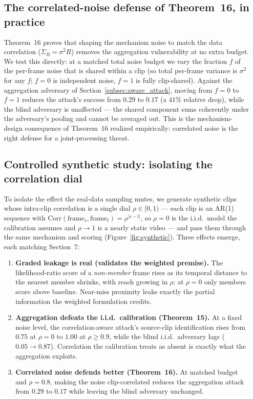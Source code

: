 \subsection{The correlated-noise defense of Theorem~16, in practice}
\label{subsec:corr_noise}

Theorem~16 proves that shaping the mechanism noise to match the data
correlation ($\Sigma_B=\sigma^2 R$) removes the aggregation vulnerability at
no extra budget. We test this directly: at a matched total noise budget we
vary the fraction $f$ of the per-frame noise that is shared within a clip
(so total per-frame variance is $\sigma^2$ for any $f$; $f{=}0$ is
independent noise, $f{=}1$ is fully clip-shared). Against the aggregation
adversary of Section~\ref{subsec:aware_attack}, moving from $f{=}0$ to
$f{=}1$ reduces the attack's success from $0.29$ to $0.17$ (a $41\%$
relative drop), while the blind adversary is unaffected --- the shared
component sums coherently under the adversary's pooling and cannot be
averaged out. This is the mechanism-design consequence of Theorem~16
realized empirically: correlated noise is the right defense for a
joint-processing threat.

\subsection{Controlled synthetic study: isolating the correlation dial}
\label{subsec:synthetic}

To isolate the effect the real-data sampling mutes, we generate synthetic
clips whose intra-clip correlation is a single dial $\rho\in[0,1)$ --- each
clip is an AR(1) sequence with $\mathrm{Corr}(\text{frame}_s,\text{frame}_t)
=\rho^{|s-t|}$, so $\rho{=}0$ is the i.i.d.\ model the calibration assumes
and $\rho\to1$ is a nearly static video --- and pass them through the same
mechanism and scoring (Figure~\ref{fig:synthetic}). Three effects emerge, each
matching Section~7:
\begin{enumerate}[leftmargin=*]
\item \textbf{Graded leakage is real (validates the weighted premise).} The
likelihood-ratio score of a \emph{non-member} frame rises as its temporal
distance to the nearest member shrinks, with reach growing in $\rho$; at
$\rho{=}0$ only members score above baseline. Near-miss proximity leaks
exactly the partial information the weighted formulation credits.
\item \textbf{Aggregation defeats the i.i.d.\ calibration (Theorem~15).} At a
fixed noise level, the correlation-aware attack's source-clip identification
rises from $0.75$ at $\rho{=}0$ to $1.00$ at $\rho\ge0.9$, while the blind
i.i.d.\ adversary lags ($0.05\to0.87$). Correlation the calibration treats as
absent is exactly what the aggregation exploits.
\item \textbf{Correlated noise defends better (Theorem~16).} At matched
budget and $\rho{=}0.8$, making the noise clip-correlated reduces the
aggregation attack from $0.29$ to $0.17$ while leaving the blind adversary
unchanged.
\end{enumerate}

